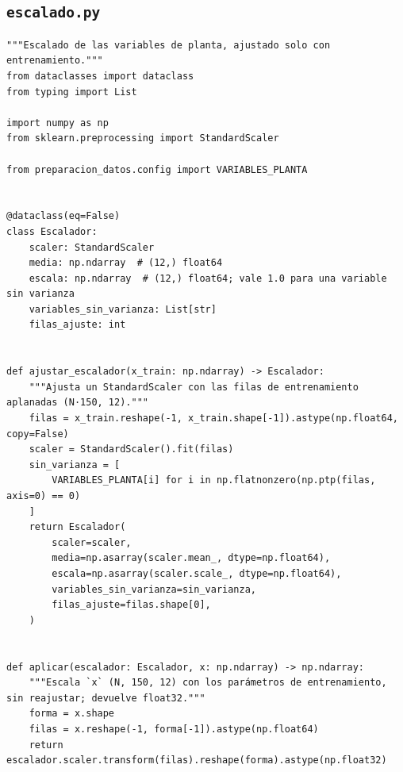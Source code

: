 \documentclass[12pt,a4paper]{article}
\begin{document}
\subsection*{\texttt{escalado.py}}
\begin{lstlisting}
"""Escalado de las variables de planta, ajustado solo con entrenamiento."""
from dataclasses import dataclass
from typing import List

import numpy as np
from sklearn.preprocessing import StandardScaler

from preparacion_datos.config import VARIABLES_PLANTA


@dataclass(eq=False)
class Escalador:
    scaler: StandardScaler
    media: np.ndarray  # (12,) float64
    escala: np.ndarray  # (12,) float64; vale 1.0 para una variable sin varianza
    variables_sin_varianza: List[str]
    filas_ajuste: int


def ajustar_escalador(x_train: np.ndarray) -> Escalador:
    """Ajusta un StandardScaler con las filas de entrenamiento aplanadas (N·150, 12)."""
    filas = x_train.reshape(-1, x_train.shape[-1]).astype(np.float64, copy=False)
    scaler = StandardScaler().fit(filas)
    sin_varianza = [
        VARIABLES_PLANTA[i] for i in np.flatnonzero(np.ptp(filas, axis=0) == 0)
    ]
    return Escalador(
        scaler=scaler,
        media=np.asarray(scaler.mean_, dtype=np.float64),
        escala=np.asarray(scaler.scale_, dtype=np.float64),
        variables_sin_varianza=sin_varianza,
        filas_ajuste=filas.shape[0],
    )


def aplicar(escalador: Escalador, x: np.ndarray) -> np.ndarray:
    """Escala `x` (N, 150, 12) con los parámetros de entrenamiento, sin reajustar; devuelve float32."""
    forma = x.shape
    filas = x.reshape(-1, forma[-1]).astype(np.float64)
    return escalador.scaler.transform(filas).reshape(forma).astype(np.float32)
\end{lstlisting}
\end{document}
